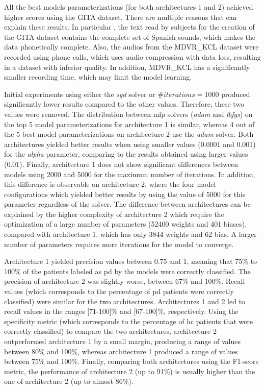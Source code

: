 All the best models parameterizations (for both architectures 1 and 2) achieved higher scores using the GITA dataset. There are multiple reasons that can explain these results. In particular , the text read by subjects for the creation of the GITA dataset contains the complete set of Spanish sounds, which makes the data phonetically complete. Also, the audios from the MDVR\_KCL dataset were recorded using phone calls, which uses audio compression with data loss, resulting in a dataset with inferior quality. In addition, MDVR\_KCL has a significantly smaller recording time, which may limit the model learning.

Initial experiments using either the \textit{sgd} solver or $\#iterations = 1000$ produced significantly lower results compared to the other values. Therefore, these two values were removed. The distribution between \gls{mlp} solvers (\textit{adam} and \textit{lbfgs}) on the top 5 model parameterizations for architecture 1 is similar, whereas 4 out of the 5 best model parameterizations on architecture 2 use the \textit{adam} solver. Both architectures yielded better results when using smaller values (0.0001 and 0.001) for the \textit{alpha} parameter, comparing to the results obtained using larger values (0.01). Finally, architecture 1 does not show significant differences between models using 2000 and 5000 for the maximum number of iterations. In addition, this difference is observable on architecture 2, where the four model configurations which yielded better results by using the value of 5000 for this parameter regardless of the solver. The difference between architectures can be explained by the higher complexity of architecture 2 which require the optimization of a large number of parameters (52400 weights and 401 biases), compared with architecture 1, which has only 3844 weights and 62 bias. A larger number of parameters requires more iterations for the model to converge.

Architecture 1 yielded precision values between 0.75 and 1, meaning that 75\% to 100\% of the patients labeled as \gls{pd} by the models were correctly classified. The precision of architecture 2 was slightly worse, between 67\% and 100\%. Recall values (which corresponds to the percentage of \gls{pd} patients were correctly classified) were similar for the two architectures. Architectures 1 and 2 led to recall values in the ranges [71-100]\% and [67-100]\%, respectively. Using the specificity metric (which corresponds to the percentage of \gls{hc} patients that were correctly classified) to compare the two architectures, architecture 2 outperformed architecture 1 by a small margin, producing a range of values between 80\% and 100\%, whereas architecture 1 produced a range of values between 75\% and 100\%. Finally, comparing both architectures using the F1-score metric, the performance of architecture 2 (up to 91\%) is usually higher than the one of architecture 2 (up to almost 86\%).

